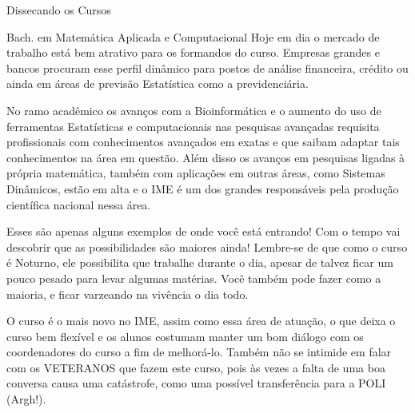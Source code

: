\begin{secao}{Dissecando os Cursos}
\begin{subsecao}{Bach. em Matemática Aplicada e Computacional}
Hoje em dia o mercado de trabalho está bem atrativo para os formandos do curso. Empresas grandes e bancos procuram esse perfil dinâmico para postos de análise financeira, crédito ou ainda em áreas de previsão Estatística como a previdenciária. 

No ramo acadêmico os avanços com a Bioinformática e o aumento do uso de ferramentas Estatísticas e computacionais nas pesquisas avançadas requisita profissionais com conhecimentos avançados em exatas e que saibam adaptar tais conhecimentos na área em questão. Além disso os avanços em pesquisas ligadas à própria matemática, também com aplicações em outras áreas, como Sistemas Dinâmicos, estão em alta e o IME é um dos grandes responsáveis pela produção científica nacional nessa área.

Esses são apenas alguns exemplos de onde você está entrando! Com o tempo vai descobrir que as possibilidades são maiores ainda! Lembre-se de que como o curso é Noturno, ele possibilita que trabalhe durante o dia, apesar de talvez ficar um pouco pesado para levar algumas matérias. Você também pode fazer como a maioria, e ficar varzeando na vivência o dia todo.

O curso é o mais novo no IME, assim como essa área de atuação, o que deixa o curso bem flexível e os alunos costumam manter um bom diálogo com os coordenadores do curso a fim de melhorá-lo. Também não se intimide em falar com os VETERANOS que fazem este curso, pois às vezes a falta de uma boa conversa causa uma catástrofe, como uma possível transferência para a POLI (Argh!).


\end{subsecao}
\end{secao}
